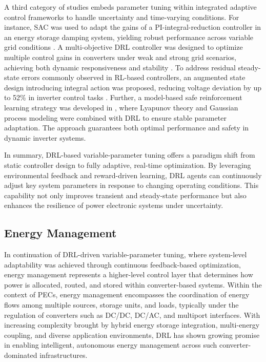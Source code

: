 A third category of studies embeds parameter tuning within integrated adaptive control frameworks to handle uncertainty and time-varying conditions. For instance, SAC was used to adapt the gains of a PI-integral-reduction controller in an energy storage damping system, yielding robust performance across variable grid conditions \cite{li2021mechanism}. A multi-objective DRL controller was designed to optimize multiple control gains in converters under weak and strong grid scenarios, achieving both dynamic responsiveness and stability \cite{jiang2023stability}. To address residual steady-state errors commonly observed in RL-based controllers, an augmented state design introducing integral action was proposed, reducing voltage deviation by up to 52\% in inverter control tasks \cite{weber2023steady}. Further, a model-based safe reinforcement learning strategy was developed in \cite{shuai2024safe}, where Lyapunov theory and Gaussian process modeling were combined with DRL to ensure stable parameter adaptation. The approach guarantees both optimal performance and safety in dynamic inverter systems.

In summary, DRL-based variable-parameter tuning offers a paradigm shift from static controller design to fully adaptive, real-time optimization. By leveraging environmental feedback and reward-driven learning, DRL agents can continuously adjust key system parameters in response to changing operating conditions. This capability not only improves transient and steady-state performance but also enhances the resilience of power electronic systems under uncertainty.

\subsection{Energy Management}
\label{sec:ctrl_energymgmt}

In continuation of DRL-driven variable-parameter tuning, where system-level adaptability was achieved through continuous feedback-based optimization, energy management represents a higher-level control layer that determines how power is allocated, routed, and stored within converter-based systems. Within the context of PECs, energy management encompasses the coordination of energy flows among multiple sources, storage units, and loads, typically under the regulation of converters such as DC/DC, DC/AC, and multiport interfaces. With increasing complexity brought by hybrid energy storage integration, multi-energy coupling, and diverse application environments, DRL has shown growing promise in enabling intelligent, autonomous energy management across such converter-dominated infrastructures.

